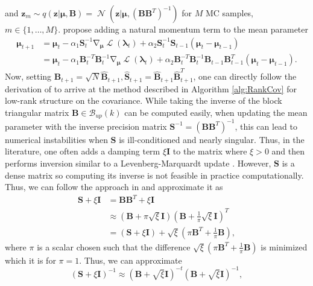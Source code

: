 \documentclass[a4paper, 11pt, oneside]{scrartcl}
\theoremstyle{break}
\DeclareMathOperator{\Normal}{\mathcal{N}}
\DeclareMathOperator{\grad}{\nabla}
\DeclareMathOperator{\ELBO}{\mathcal{L}}
\newcommand{\matr}[1]{\boldsymbol{#1}}
\newcommand{\set}[1]{\mathcal{#1}}
\numberwithin{equation}{section}
\begin{document}
				and $\matr{z}_m \sim q(\matr{z} | \matr{\mu}, \matr{B}) = \Normal(\matr{z} | \matr{\mu}, (\matr{B} \matr{B}^T)^{-1})$ for $M$ MC samples, $m \in \{1, \dots, M\}$.
				\parencite{KNT+18, LSK20} propose adding a natural momentum term to the mean parameter
				\begin{align*}
					\matr{\mu}_{t+1} &= \matr{\mu}_t - \alpha_1 \matr{S}_t^{-1} \grad_{\matr{\mu}} \ELBO (\matr{\lambda}_t) + \alpha_2 \matr{S}_t^{-1} \matr{S}_{t-1} (\matr{\mu}_t - \matr{\mu}_{t-1}) \\
					&= \matr{\mu}_t - \alpha_1 \matr{B}_t^{-T} \matr{B}_t^{-1} \grad_{\matr{\mu}} \ELBO (\matr{\lambda}_t) + \alpha_2 \matr{B}_t^{-T} \matr{B}_t^{-1} \matr{B}_{t-1} \matr{B}_{t-1}^T (\matr{\mu}_t - \matr{\mu}_{t-1}).
				\end{align*}
				Now, setting $\matr{B}_{t+1} = \sqrt{N} \matr{\hat{B}}_{t+1}, \matr{\hat{S}}_{t+1} = \matr{\hat{B}}_{t+1} \matr{\hat{B}}_{t+1}^T$, one can directly follow the derivation of \parencite[Sec. E.3]{LSK20} to arrive at the method described in Algorithm \ref{alg:RankCov} for low-rank structure on the covariance.
				While taking the inverse of the block triangular matrix $\matr{B} \in \set{B}_{up}(k)$ can be computed easily, when updating the mean parameter with the inverse precision matrix $\matr{S}^{-1} = (\matr{B} \matr{B}^T)^{-1}$, this can lead to numerical instabilities when $\matr{S}$ is ill-conditioned and nearly singular. 
				Thus, in the literature, one often adds a damping term $\xi \matr{I}$ to the matrix where $\xi > 0$ and then performs inversion similar to a Levenberg-Marquardt update \parencite{L44, M63}.
				However, $\matr{S}$ is a dense matrix so computing its inverse is not feasible in practice computationally.
				Thus, we can follow the approach in \parencite[Sec. 6.3]{MG15} and approximate it as 
				\begin{align*}
					\matr{S} + \xi \matr{I} &= \matr{B} \matr{B}^T + \xi \matr{I} \\
					&\approx (\matr{B} + \pi \sqrt{\xi} \matr{I}) (\matr{B} + \frac{1}{\pi} \sqrt{\xi} \matr{I})^T \\
					&= (\matr{S} + \xi \matr{I}) + \sqrt{\xi} \left(\pi \matr{B}^T + \frac{1}{\pi} \matr{B} \right),
				\end{align*}
				where $\pi$ is a scalar chosen such that the difference $\sqrt{\xi}(\pi \matr{B}^T + \frac{1}{\pi} \matr{B})$ is minimized which it is for $\pi = 1$.
				Thus, we can approximate
				\begin{equation*}
					(\matr{S} + \xi \matr{I})^{-1} \approx (\matr{B} + \sqrt{\xi} \matr{I})^{-t} (\matr{B} + \sqrt{\xi} \matr{I})^{-1},
				\end{equation*}
\end{document}
